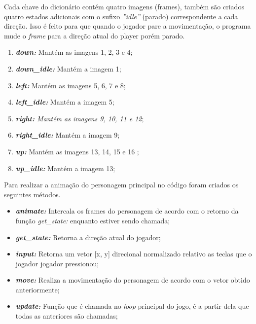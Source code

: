 Cada chave do dicionário contém quatro imagens (frames), também são criados quatro estados adicionais com o sufixo \textit{''idle''} (parado) correspondente a cada direção. Isso é feito para que quando o jogador pare a movimentação, o programa mude o \textit{frame} para a direção atual do player porém parado. 
\begin{enumerate}
    \item \textit{\textbf{down:}} Mantém as imagens 1, 2, 3 e 4;
    \item \textit{\textbf{down\_idle:}} Mantém a imagem 1;
    \item \textit{\textbf{left:}} Mantém as imagens 5, 6, 7 e 8;
    \item \textit{\textbf{left\_idle:}} Mantém a imagem 5;
    \item \textit{\textbf{right:} Mantém as imagens 9, 10, 11 e 12};
    \item \textit{\textbf{right\_idle:}} Mantém a imagem 9;
    \item \textit{\textbf{up:}} Mantém as imagens 13, 14, 15 e 16 ;
    \item \textit{\textbf{up\_idle:}} Mantém a imagem 13;
\end{enumerate}

Para realizar a animação do personagem principal no código foram criados os seguintes métodos.

\begin{itemize}
    \item \textit{\textbf{animate:}} Intercala os frames do personagem de acordo com o retorno da função \textit{get\_state:} enquanto estiver sendo chamada;
    \item \textit{\textbf{get\_state:}} Retorna a direção atual do jogador;
    \item \textit{\textbf{input:}}  Retorna um vetor [x, y] direcional normalizado relativo as teclas que o jogador jogador pressionou;
    \item \textit{\textbf{move:}} Realiza a movimentação do personagem de acordo com o vetor obtido anteriormente;
    \item \textit{\textbf{update:}} Função que é chamada no \textit{loop} principal do jogo, é a partir dela que todas as anteriores são chamadas;

\end{itemize}

